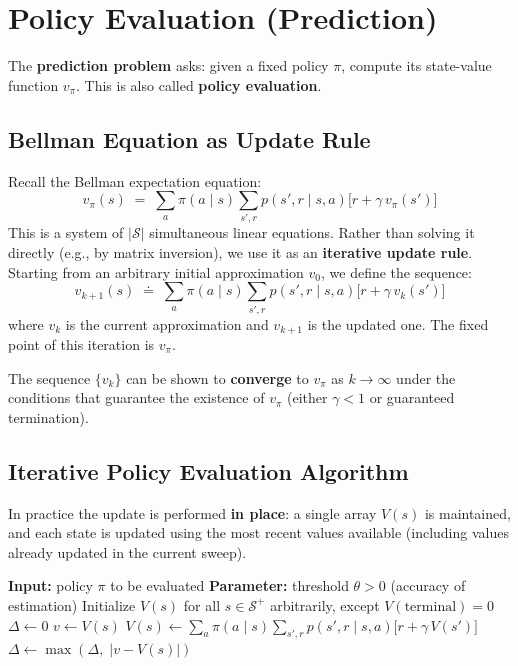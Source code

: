 \documentclass[11pt,a4paper]{article}
\theoremstyle{definition}
\theoremstyle{plain}
\theoremstyle{remark}
\begin{document}
\section{Policy Evaluation (Prediction)}

The \textbf{prediction problem} asks: given a fixed policy $\pi$, compute its state-value function $v_\pi$. This is also called \textbf{policy evaluation}.

\subsection{Bellman Equation as Update Rule}

Recall the Bellman expectation equation:
\[
    v_\pi(s) \;=\; \sum_a \pi(a \mid s) \sum_{s', r} p(s', r \mid s, a) \bigl[r + \gamma\, v_\pi(s')\bigr]
\]
This is a system of $|\mathcal{S}|$ simultaneous linear equations. Rather than solving it directly (e.g., by matrix inversion), we use it as an \textbf{iterative update rule}. Starting from an arbitrary initial approximation $v_0$, we define the sequence:
\[
    v_{k+1}(s) \;\doteq\; \sum_a \pi(a \mid s) \sum_{s', r} p(s', r \mid s, a) \bigl[r + \gamma\, v_k(s')\bigr]
\]
where $v_k$ is the current approximation and $v_{k+1}$ is the updated one. The fixed point of this iteration is $v_\pi$.

\begin{tcolorbox}[colback=green!5!white, colframe=green!60!black, title={Convergence of Iterative Policy Evaluation}]
The sequence $\{v_k\}$ can be shown to \textbf{converge} to $v_\pi$ as $k \to \infty$ under the conditions that guarantee the existence of $v_\pi$ (either $\gamma < 1$ or guaranteed termination).
\end{tcolorbox}

\subsection{Iterative Policy Evaluation Algorithm}

In practice the update is performed \textbf{in place}: a single array $V(s)$ is maintained, and each state is updated using the most recent values available (including values already updated in the current sweep).

\begin{algorithm}
\caption{Iterative Policy Evaluation (in-place), estimating $V \approx v_\pi$}
\begin{algorithmic}
\STATE \textbf{Input:} policy $\pi$ to be evaluated
\STATE \textbf{Parameter:} threshold $\theta > 0$ (accuracy of estimation)
\STATE Initialize $V(s)$ for all $s \in \mathcal{S}^+$ arbitrarily, except $V(\text{terminal}) = 0$
\REPEAT
    \STATE $\Delta \leftarrow 0$
        \STATE $v \leftarrow V(s)$
        \STATE $V(s) \leftarrow \sum_a \pi(a \mid s) \sum_{s', r} p(s', r \mid s, a)\bigl[r + \gamma\, V(s')\bigr]$
        \STATE $\Delta \leftarrow \max(\Delta,\; |v - V(s)|)$
    \ENDFOR
\UNTIL{$\Delta < \theta$}
\end{algorithmic}
\end{algorithm}
\end{document}
